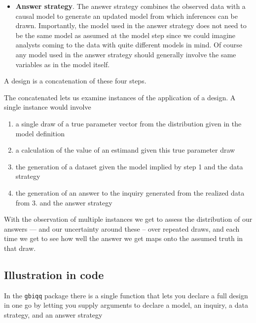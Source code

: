 \documentclass[12pt,]{book}
\providecommand{\tightlist}{%
  \setlength{\itemsep}{0pt}\setlength{\parskip}{0pt}}
\begin{document}
\begin{itemize}
\item
  \textbf{Answer strategy}. The answer strategy combines the observed data with a causal model to generate an updated model from which inferences can be drawn. Importantly, the model used in the answer strategy does not need to be the same model as assumed at the model step since we could imagine analysts coming to the data with quite different models in mind. Of course any model used in the answer strategy should generally involve the same variables as in the model itself.
\end{itemize}

A design is a concatenation of these four steps.

The concatenated lets us examine instances of the application of a design. A single instance would involve

\begin{enumerate}
\def\labelenumi{\arabic{enumi}.}
\tightlist
\item
  a single draw of a true parameter vector from the distribution given in the model definition
\item
  a calculation of the value of an estimand given this true parameter draw
\item
  the generation of a dataset given the model implied by step 1 and the data strategy
\item
  the generation of an answer to the inquiry generated from the realized data from 3. and the answer strategy
\end{enumerate}

With the observation of multiple instances we get to assess the distribution of our answers --- and our uncertainty around these -- over repeated draws, and each time we get to see how well the answer we get maps onto the assumed truth in that draw.

\hypertarget{illustration-in-code}{%
\subsection{Illustration in code}\label{illustration-in-code}}

In the \texttt{gbiqq} package there is a single function that lets you declare a full design in one go by letting you supply arguments to declare a model, an inquiry, a data strategy, and an answer strategy
\end{document}
